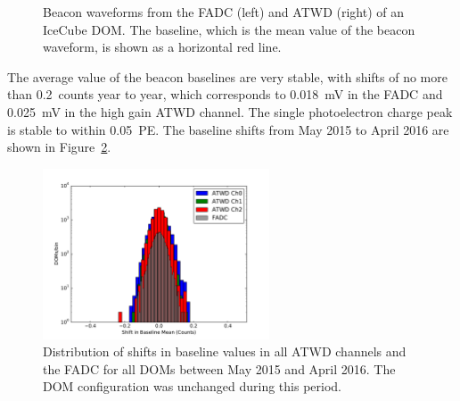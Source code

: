 \begin{figure}[!h]
  \captionsetup[subfigure]{labelformat=empty}
  \centering
  \caption{Beacon waveforms from the FADC (left) and ATWD (right) of
    an IceCube DOM. The baseline, which is the mean value of the
    beacon waveform, is shown as a horizontal red line.}
  \label{fig:raw_baselines}
\end{figure}


The average value of the
beacon baselines are very stable, with shifts of no more than
0.2~counts year to year, which corresponds to 0.018~mV in the FADC and
0.025~mV in the high gain ATWD channel. The single photoelectron
charge peak is stable to within 0.05~PE. The baseline shifts from May
2015 to April 2016 are shown in
Figure~\ref{fig:baseline_stability_2015}. 

\begin{figure}[!h]
 \centering
 \includegraphics[width=0.6\textwidth]{graphics/dom/reliability/baseline_stability_2015.pdf}
 \caption{Distribution of shifts in baseline values in all ATWD
   channels and the FADC for all DOMs between May 2015 and April
   2016. The DOM configuration was unchanged during this period.}
 \label{fig:baseline_stability_2015}
\end{figure}

